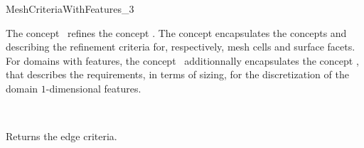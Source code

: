 \ccRefPageBegin


\begin{ccRefConcept}{MeshCriteriaWithFeatures_3}


\ccDefinition
The concept \ccRefName\ refines the concept .
The concept  encapsulates 
the concepts  and 
 describing the refinement
criteria for, respectively,  mesh cells and surface facets.
For domains with features, the concept \ccRefName\ 
additionnally encapsulates the
 concept ,
that describes the requirements, in terms of sizing, %
for the discretization of the domain $1$-dimensional features.

\ccRefines

 \\


\ccTypes






\ccAccessFunctions

{Returns the edge criteria.}




\ccHasModels
{}

\ccSeeAlso
{}
\\
\\
 \\
 \\
 \\



\end{ccRefConcept}

\ccRefPageEnd

